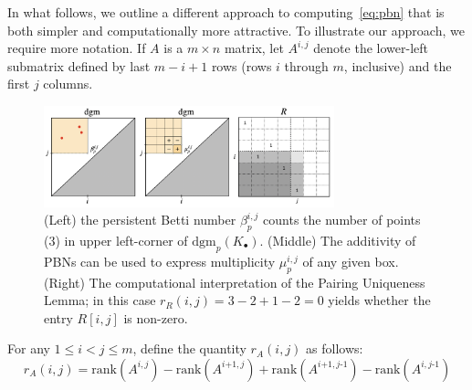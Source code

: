 \documentclass[10pt]{article}
\newcommand{\+}{%
	\raisebox{0.18ex}{\scaleobj{0.55}{+}}
}
\begin{document}

In what follows, we outline a different approach to computing~\eqref{eq:pbn} that is both simpler and computationally more attractive. 
To illustrate our approach, we require more notation. If $A$ is a $m \times n$ matrix, let $A^{i, j}$ denote the lower-left submatrix defined by last $m - i + 1$ rows (rows $i$ through $m$, inclusive) and the first $j$ columns. 
\begin{figure}
\centering
	\includegraphics[width=0.75\textwidth]{fig1}
	\caption{(Left) the persistent Betti number $\beta_p^{i,j}$ counts the number of points (3) in upper left-corner of $\mathrm{dgm}_p(K_\bullet)$. (Middle) The additivity of PBNs can be used to express multiplicity $\mu_p^{i,j}$ of any given box. (Right) The computational interpretation of the Pairing Uniqueness Lemma; in this case $r_R(i,j) = 3 - 2 + 1 - 2 = 0$ yields whether the entry $R[i,j]$ is non-zero.}
	\label{fig:mult}
\end{figure}
For any $1 \leq i < j \leq m$, define the quantity $r_A(i,j)$ as follows:
\begin{equation}
	r_A(i,j) = \mathrm{rank}(A^{i,j}) - \mathrm{rank}(A^{i\texttt{+}1,j}) + \mathrm{rank}(A^{i\texttt{+}1,j\text{-}1}) - \mathrm{rank}(A^{i,j\text{-}1})
\end{equation}
\end{document}

